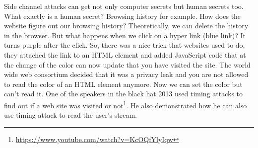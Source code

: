 Side channel attacks can get not only computer secrets but human secrets too.
What exactly is a human secret? Browsing history for example. How does the
website figure out our browsing history? Theoretically, we can delete the
history in the browser. But what happens when we click on a hyper link (blue
link)? It turns purple after the click. So, there was a nice trick that websites
used to do, they attached the link to an HTML element and added JavaScript code
that at the change of the color can now update that you have visited the site.
The world wide web consortium decided that it was a privacy leak and you are not
allowed to read the color of an HTML element anymore. Now we can set the color
but can't read it. One of the speakers in the black hat 2013 used timing attacks
to find out if a web site was visited or
not\footnote{\url{https://www.youtube.com/watch?v=KcOQfYlyIqw}}. He also
demonstrated how he can also use timing attack to read the user's stream. 

